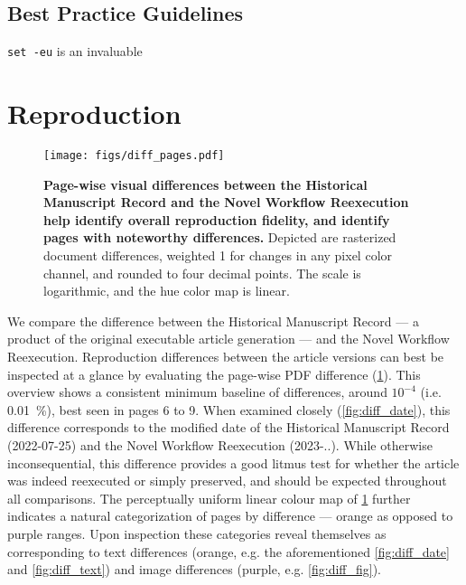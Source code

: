 \subsection{Best Practice Guidelines}

\texttt{set -eu} is an invaluable


\section{Reproduction}



\begin{figure}
	\centering
	\texttt{[image: figs/diff\_pages.pdf]}
	\caption{
		\textbf{Page-wise visual differences between the Historical Manuscript Record and the Novel Workflow Reexecution help identify overall reproduction fidelity, and identify pages with noteworthy differences.}
		Depicted are rasterized document differences, weighted 1 for changes in any pixel color channel, and rounded to four decimal points.
		The scale is logarithmic, and the hue color map is linear.
	}
	\label{fig:diff_pages}
\end{figure}

We compare the difference between the Historical Manuscript Record — a product of the original executable article generation — and the Novel Workflow Reexecution.
Reproduction differences between the article versions can best be inspected at a glance by evaluating the page-wise PDF difference (\ref{fig:diff_pages}).
This overview shows a consistent minimum baseline of differences, around $10^{-4}$ (i.e. \SI{0.01}{\percent}), best seen in pages 6 to 9.
When examined closely (\ref{fig:diff_date}), this difference corresponds to the modified date of the Historical Manuscript Record (2022-07-25) and the Novel Workflow Reexecution (2023-..).
While otherwise inconsequential, this difference provides a good litmus test for whether the article was indeed reexecuted or simply preserved, and should be expected throughout all comparisons.
The perceptually uniform linear colour map of \cref{fig:diff_pages} further indicates a natural categorization of pages by difference — orange as opposed to purple ranges.
Upon inspection these categories reveal themselves as corresponding to text differences (orange, e.g. the aforementioned \cref{fig:diff_date} and \cref{fig:diff_text}) and image differences (purple, e.g. \cref{fig:diff_fig}).

